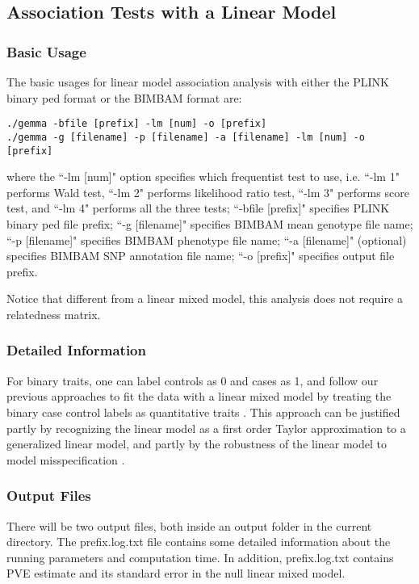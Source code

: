 \documentclass[11pt]{article}
\begin{document}
\subsection{Association Tests with a Linear Model}

\subsubsection{Basic Usage}

The basic usages for linear model association analysis with either the PLINK binary ped format or the BIMBAM format are:

\begin{verbatim}
./gemma -bfile [prefix] -lm [num] -o [prefix]
./gemma -g [filename] -p [filename] -a [filename] -lm [num] -o [prefix]
\end{verbatim}

where the ``-lm [num]" option specifies which frequentist test to use,
i.e. ``-lm 1" performs Wald test, ``-lm 2" performs likelihood ratio
test, ``-lm 3" performs score test, and ``-lm 4" performs all the
three tests; ``-bfile [prefix]" specifies PLINK binary ped file
prefix; ``-g [filename]" specifies BIMBAM mean genotype file name;
``-p [filename]" specifies BIMBAM phenotype file name; ``-a
[filename]" (optional) specifies BIMBAM SNP annotation file name; ``-o
[prefix]" specifies output file prefix.

Notice that different from a linear mixed model, this analysis does
not require a relatedness matrix.

\subsubsection{Detailed Information}

For binary traits, one can label controls as 0 and cases as 1, and
follow our previous approaches to fit the data with a linear mixed
model by treating the binary case control labels as quantitative
traits \cite{Zhou:2012, Zhou:2013}. This approach can be justified
partly by recognizing the linear model as a first order Taylor
approximation to a generalized linear model, and partly by the
robustness of the linear model to model misspecification
\cite{Zhou:2013}.

\subsubsection{Output Files}

There will be two output files, both inside an output folder in the
current directory. The prefix.log.txt file contains some detailed
information about the running parameters and computation time. In
addition, prefix.log.txt contains PVE estimate and its standard error
in the null linear mixed model.
\end{document}
